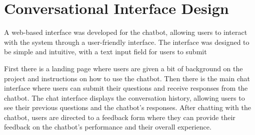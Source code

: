 \section{Conversational Interface Design}
\label{sec:conversational_interface_design}

A web-based interface was developed for the chatbot, allowing users to interact with the system through a user-friendly interface.
The interface was designed to be simple and intuitive, with a text input field for users to submit

First there is a landing page where users are given a bit of background on the project and instructions on how to use the chatbot.
Then there is the main chat interface where users can submit their questions and receive responses from the chatbot.
The chat interface displays the conversation history, allowing users to see their previous questions and the chatbot's responses.
After chatting with the chatbot, users are directed to a feedback form where they can provide their feedback on the chatbot's performance and their overall experience.

